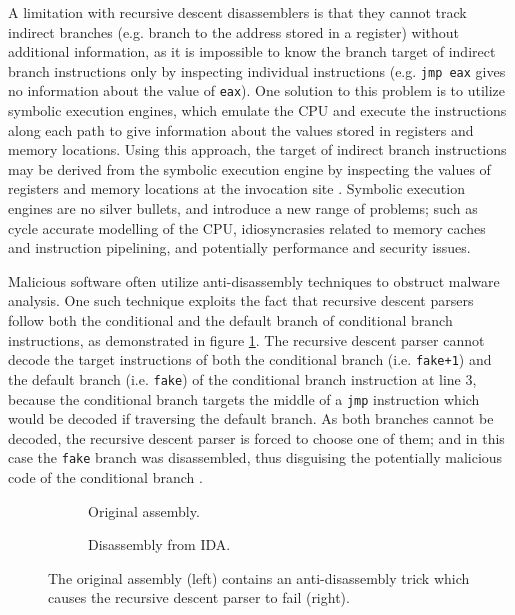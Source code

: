 A limitation with recursive descent disassemblers is that they cannot track indirect branches (e.g. branch to the address stored in a register) without additional information, as it is impossible to know the branch target of indirect branch instructions only by inspecting individual instructions (e.g. \texttt{jmp eax} gives no information about the value of \texttt{eax}). One solution to this problem is to utilize symbolic execution engines, which emulate the CPU and execute the instructions along each path to give information about the values stored in registers and memory locations. Using this approach, the target of indirect branch instructions may be derived from the symbolic execution engine by inspecting the values of registers and memory locations at the invocation site \cite{mcsema}. Symbolic execution engines are no silver bullets, and introduce a new range of problems; such as cycle accurate modelling of the CPU, idiosyncrasies related to memory caches and instruction pipelining, and potentially performance and security issues.

Malicious software often utilize anti-disassembly techniques to obstruct malware analysis. One such technique exploits the fact that recursive descent parsers follow both the conditional and the default branch of conditional branch instructions, as demonstrated in figure \ref{fig:anti-disassembly}. The recursive descent parser cannot decode the target instructions of both the conditional branch (i.e. \texttt{fake+1}) and the default branch (i.e. \texttt{fake}) of the conditional branch instruction at line 3, because the conditional branch targets the middle of a \texttt{jmp} instruction which would be decoded if traversing the default branch. As both branches cannot be decoded, the recursive descent parser is forced to choose one of them; and in this case the \texttt{fake} branch was disassembled, thus disguising the potentially malicious code of the conditional branch \cite{anti_disassembly}.

\begin{figure}[htbp]
	\centering
	\begin{subfigure}[t]{0.59\textwidth}
		
		\caption{Original assembly.}
	\end{subfigure}
	\qquad
	\begin{subfigure}[t]{0.34\textwidth}
		
		\caption{Disassembly from IDA.}
	\end{subfigure}
	\caption{The original assembly (left) contains an anti-disassembly trick which causes the recursive descent parser to fail (right).}
	\label{fig:anti-disassembly}
\end{figure}

